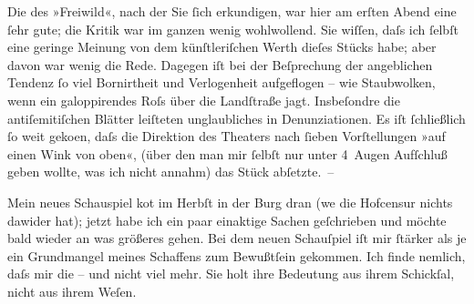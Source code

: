 \pstart
           Die \label{K_L00787-2v}\label{K_L00787-2} des »Freiwild«,
               nach der Sie ſich erkundigen, war hier am erſten Abend eine ſehr gute; die Kritik war
               im ganzen wenig wohlwollend. Sie wiſſen, daſs ich ſelbſt {\pb}eine geringe Meinung von dem künſtleriſchen Werth
               dieſes Stücks habe; aber davon
               war wenig die Rede. Dagegen  iſt bei der
               Beſprechung der angeblichen Tendenz ſo viel Bornirtheit und Verlogenheit aufgeflogen
               – wie Staubwolken, wenn ein galoppirendes Roſs über die Landſtraße jagt. Insbeſondre
               die antiſemitiſchen Blätter leiſteten unglaubliches in Denunziationen. Es iſt
               ſchließlich ſo weit geko{\geminationm}en, daſs die Direktion {\pb}des Theaters nach ſieben Vorſtellungen »auf einen Wink von
               oben«, (über den man mir ſelbſt nur unter 4 Augen Aufſchluß geben wollte, was ich
               nicht annahm) das Stück abſetzte. –\pend
           
\pstart
           Mein neues Schauspiel ko{\geminationm}t im Herbſt in der Burg dran (we{\geminationn} die Hofcensur nichts dawider
               hat); jetzt habe ich ein paar einaktige Sachen geſchrieben und möchte bald wieder an was größeres
               gehen. Bei dem neuen Schauſpiel iſt mir ſtärker als je ein Grundmangel {\pb}meines Schaffens zum Bewußtſein gekommen. Ich
               finde nemlich, daſs mir die \label{K_L00787-3v}\label{K_L00787-3} – und nicht viel mehr. Sie holt ihre Bedeutung aus ihrem Schickſal, nicht aus
               ihrem Weſen.\pend
           
